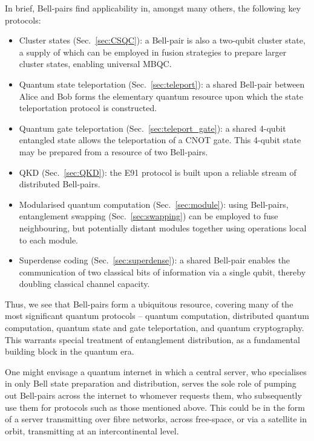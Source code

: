 \documentclass[aps, rmp, twocolumn, amsmath, amssymb, nofootinbib, superscriptaddress, longbibliography, floatfix, table-of-contents, eqsecnum]{revtex4-1}
\begin{document}
In brief, Bell-pairs find applicability in, amongst many others, the following key protocols:
\begin{itemize}
\item Cluster states (Sec.~\ref{sec:CSQC}): a Bell-pair is also a two-qubit cluster state, a supply of which can be employed in fusion strategies to prepare larger cluster states, enabling universal MBQC.
\item Quantum state teleportation (Sec.~\ref{sec:teleport}): a shared Bell-pair between Alice and Bob forms the elementary quantum resource upon which the state teleportation protocol is constructed.
\item Quantum gate teleportation (Sec.~\ref{sec:teleport_gate}): a shared 4-qubit entangled state allows the teleportation of a CNOT gate. This 4-qubit state may be prepared from a resource of two Bell-pairs.
\item QKD (Sec.~\ref{sec:QKD}): the E91 protocol is built upon a reliable stream of distributed Bell-pairs.
\item Modularised quantum computation (Sec.~\ref{sec:module}): using Bell-pairs, entanglement swapping (Sec.~\ref{sec:swapping}) can be employed to fuse neighbouring, but potentially distant modules together using operations local to each module.
\item Superdense coding (Sec.~\ref{sec:superdense}): a shared Bell-pair enables the communication of two classical bits of information via a single qubit, thereby doubling classical channel capacity.
\end{itemize}

Thus, we see that Bell-pairs form a ubiquitous resource, covering many of the most significant quantum protocols -- quantum computation, distributed quantum computation, quantum state and gate teleportation, and quantum cryptography. This warrants special treatment of entanglement distribution, as a fundamental building block in the quantum era.

One might envisage a quantum internet in which a central server, who specialises in only Bell state preparation and distribution, serves the sole role of pumping out Bell-pairs across the internet to whomever requests them, who subsequently use them for protocols such as those mentioned above. This could be in the form of a server transmitting over fibre networks, across free-space, or via a satellite in orbit, transmitting at an intercontinental level.
\end{document}
